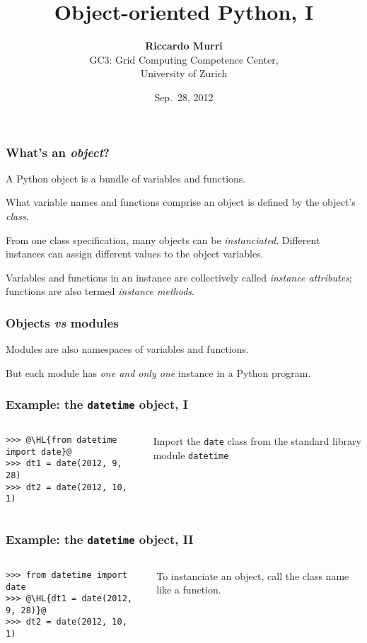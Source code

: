 \documentclass[english,serif,mathserif,xcolor=pdftex,dvipsnames,table]{beamer}
\title[OOP]{%
  Object-oriented Python, I
}
\author[R. Murri]{%
  \textbf{Riccardo Murri} \\
  GC3: Grid Computing Competence Center, \\
  University of Zurich
}
\date{Sep.~28, 2012}
\begin{document}
\maketitle


\begin{frame}
  \frametitle{What's an \emph{object}?}
  A Python object is a bundle of variables and functions.

  \+ 
  What variable names and functions comprise an object is defined
  by the object's \emph{class}.

  \+ 
  From one class specification, many objects can be
  \emph{instanciated}.  Different instances can assign different
  values to the object variables.
  
  \+ 
  Variables and functions in an instance are collectively called
  \emph{instance attributes}; functions are also termed \emph{instance
    methods}.
\end{frame}


\begin{frame}
  \frametitle{Objects \emph{vs} modules}

  Modules are also namespaces of variables and functions.

  \+ 
  But each module has \emph{one and only one} instance in a Python
  program.
\end{frame}


\begin{frame}[fragile]
  \frametitle{Example: the \texttt{datetime} object, I}
  \begin{columns}[c]
    \begin{column}{0.5\textwidth}
\begin{lstlisting}
>>> @\HL{from datetime import date}@
>>> dt1 = date(2012, 9, 28)
>>> dt2 = date(2012, 10, 1)
\end{lstlisting}
    \end{column}
    \begin{column}{0.45\textwidth}
      \raggedleft 
      Import the \texttt{date} class from the standard
      library module \texttt{datetime}
    \end{column}
  \end{columns}
\end{frame}


\begin{frame}[fragile]
  \frametitle{Example: the \texttt{datetime} object, II}
  \begin{columns}[c]
    \begin{column}{0.5\textwidth}
\begin{lstlisting}
>>> from datetime import date
>>> @\HL{dt1 = date(2012, 9, 28)}@
>>> dt2 = date(2012, 10, 1)
\end{lstlisting}
    \end{column}
    \begin{column}{0.5\textwidth}
      \raggedleft 
      To instanciate an object, call the class name like a
      function.
    \end{column}
  \end{columns}
\end{frame}
\end{document}
